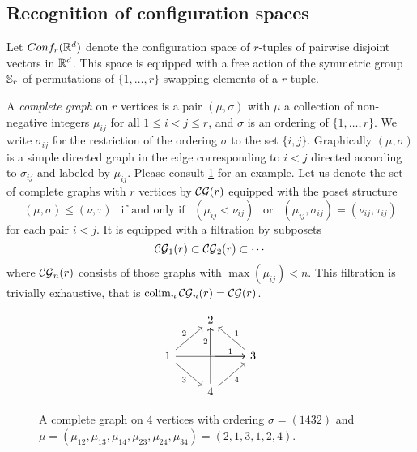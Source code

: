 
\subsection{Recognition of configuration spaces}\label{ss:recognition}

Let $Conf_{r}(\mathbb{R}^{d})$ denote the configuration space of $r$-tuples of pairwise disjoint vectors in $\mathbb{R}^{d}$.
This space is equipped with a free action of the symmetric group $\mathbb{S}_r$ of permutations of $\{1,\dots,r\}$ swapping elements of a $r$-tuple.

\begin{definition}
	A \textit{complete graph} on $r$ vertices is a pair $(\mu,\sigma)$ with $\mu$ a collection of non-negative integers $\mu_{ij}$ for all $1 \leq i < j \leq r$, and $\sigma$ is an ordering of $\{1,\dots,r\}$.
	We write $\sigma_{ij}$ for the restriction of the ordering $\sigma$ to the set $\{i,j\}$.
	Graphically $(\mu,\sigma)$ is a simple directed graph in the edge corresponding to $i<j$ directed according to $\sigma_{ij}$ and labeled by $\mu_{ij}$.
	Please consult \cref{f:complete graph} for an example.
	Let us denote the set of complete graphs with $r$ vertices by $\mathcal{CG}(r)$ equipped with the poset structure
	\begin{equation*}
		(\mu,\sigma)\le (\nu,\tau) \ \ \text{ if and only if } \ \
		(\mu_{ij}<\nu_{ij}) \ \ \text{ or } \ \
		(\mu_{ij},\sigma_{ij})= (\nu_{ij},\tau_{ij})
	\end{equation*}
	for each pair $i<j$.
	It is equipped with a filtration by subposets
	\[
	\mathcal{CG}_1(r) \subset \mathcal{CG}_2(r) \subset \dotsb
	\]
	where $\mathcal{CG}_n(r)$ consists of those graphs with $\max(\mu_{ij})< n$. This filtration is trivially exhaustive, that is $\operatorname*{colim}_{n}\mathcal{CG}_n(r)=\mathcal{CG}(r)$.
\end{definition}

\begin{figure}
	\centering
	\begin{equation*}
		\begin{tikzcd}
			\ & 2 & \ \\
			1 \arrow[ur,"2"] \arrow[rr] \arrow[dr,"3"']& \arrow[r,"1"] \arrow[u,"2"] & 3 \arrow[ul,"1"'] \\
			\ & 4 \arrow[ur,"4"'] \arrow[uu] & \
		\end{tikzcd}
	\end{equation*}
	\caption{A complete graph on 4 vertices with ordering $\sigma=(1432)$ and $\mu=(\mu_{12},\mu_{13},\mu_{14},\mu_{23},\mu_{24},\mu_{34})=(2,1,3,1,2,4)$.}
	\label{f:complete graph}
\end{figure}

